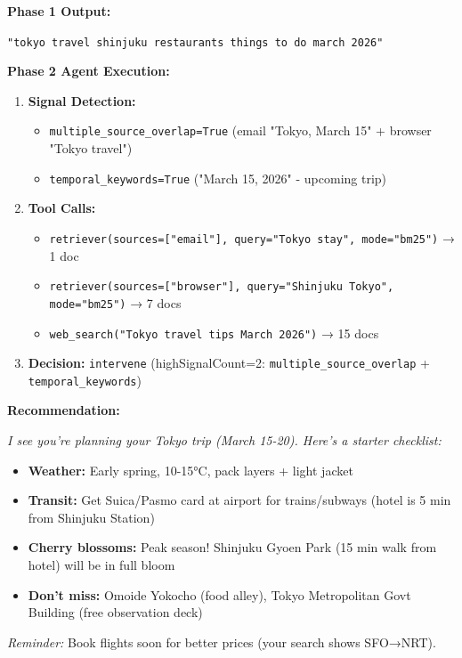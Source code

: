 \documentclass[11pt,a4paper]{article}
\begin{document}
\textbf{Phase 1 Output:}
\begin{tcolorbox}[colback=blue!5,colframe=blue!80]
\texttt{"tokyo travel shinjuku restaurants things to do march 2026"}
\end{tcolorbox}

\textbf{Phase 2 Agent Execution:}
\begin{enumerate}[leftmargin=*]
    \item \textbf{Signal Detection:}
    \begin{itemize}
        \item \texttt{multiple\_source\_overlap=True} (email "Tokyo, March 15" + browser "Tokyo travel")
        \item \texttt{temporal\_keywords=True} ("March 15, 2026" - upcoming trip)
    \end{itemize}
    \item \textbf{Tool Calls:}
    \begin{itemize}
        \item \texttt{retriever(sources=["email"], query="Tokyo stay", mode="bm25")} → 1 doc
        \item \texttt{retriever(sources=["browser"], query="Shinjuku Tokyo", mode="bm25")} → 7 docs
        \item \texttt{web\_search("Tokyo travel tips March 2026")} → 15 docs
    \end{itemize}
    \item \textbf{Decision:} \texttt{intervene} (highSignalCount=2: \texttt{multiple\_source\_overlap} + \texttt{temporal\_keywords})
\end{enumerate}

\textbf{Recommendation:}
\begin{tcolorbox}[colback=green!5,colframe=green!80]
\textit{I see you're planning your Tokyo trip (March 15-20). Here's a starter checklist:}
\begin{itemize}
    \item \textbf{Weather:} Early spring, 10-15°C, pack layers + light jacket
    \item \textbf{Transit:} Get Suica/Pasmo card at airport for trains/subways (hotel is 5 min from Shinjuku Station)
    \item \textbf{Cherry blossoms:} Peak season! Shinjuku Gyoen Park (15 min walk from hotel) will be in full bloom
    \item \textbf{Don't miss:} Omoide Yokocho (food alley), Tokyo Metropolitan Govt Building (free observation deck)
\end{itemize}
\textit{Reminder:} Book flights soon for better prices (your search shows SFO→NRT).
\end{tcolorbox}
\end{document}
